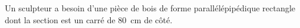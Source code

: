 
\begin{exercice}\label{exo2smath-0131}

    Un sculpteur a besoin d'une pièce de bois de forme parallélépipédique rectangle dont la section est un carré de \SI{80}{\centi\meter} de côté.

\end{exercice}
